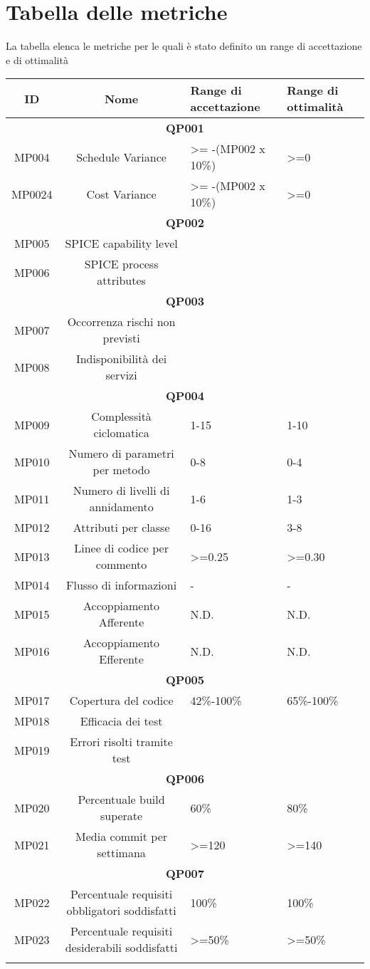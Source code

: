 \section{Tabella delle metriche}
\label{Tab2.2}
La tabella elenca le metriche per le quali è stato definito un range di accettazione e di ottimalità
\begin{tabularx}{\textwidth}{|c|c|X|X|}
	\hline 
	\textbf{ID} & \textbf{Nome} & \textbf{Range di accettazione}  & \textbf{Range di ottimalità}  \\ 
	\hline
	\multicolumn{4}{|c|}{\textbf{QP001}} \\
	\hline 
	MP004 & Schedule Variance & >= -(MP002 x 10\%) & >=0 \\ 
	\hline
	MP0024 &Cost Variance& >= -(MP002 x 10\%) & >=0 \\ 
	\hline
	\multicolumn{4}{|c|}{\textbf{QP002}} \\
	\hline
	MP005 & SPICE capability level &  &  \\ 
	\hline 
	MP006 & SPICE process attributes &  &  \\ 
	\hline
	\multicolumn{4}{|c|}{\textbf{QP003}} \\
	\hline
	MP007 & Occorrenza rischi non previsti &  &  \\ 
	\hline 
	MP008 & Indisponibilità dei servizi &  &  \\ 
	\hline
	\multicolumn{4}{|c|}{\textbf{QP004}} \\
	\hline
	MP009 & Complessità ciclomatica & 1-15 & 1-10 \\ 
	\hline 
	MP010 & Numero di parametri per metodo & 0-8 & 0-4 \\ 
	\hline 
	MP011 & Numero di livelli di annidamento & 1-6 & 1-3 \\ 
	\hline 
	MP012 & Attributi per classe & 0-16 & 3-8 \\ 
	\hline 
	MP013 & Linee di codice per commento & >=0.25 & >=0.30 \\ 
	\hline
	MP014 & Flusso di informazioni & - & - \\ 
	\hline 
	MP015 & Accoppiamento Afferente & N.D. & N.D. \\ 
	\hline 
	MP016 & Accoppiamento Efferente & N.D. & N.D. \\ 
	\hline
	\multicolumn{4}{|c|}{\textbf{QP005}} \\
	\hline
	MP017 & Copertura del codice & 42\%-100\% & 65\%-100\% \\ 
	\hline 
	MP018 & Efficacia dei test &  &  \\ 
	\hline 
	MP019 & Errori risolti tramite test &  &  \\ 
	\hline
	\multicolumn{4}{|c|}{\textbf{QP006}} \\
	\hline
	MP020 & Percentuale build superate& 60\% & 80\%\\
	\hline
	MP021 & Media commit per settimana & >=120 & >=140\\
	\hline
	\multicolumn{4}{|c|}{\textbf{QP007}} \\
	\hline
	MP022& Percentuale requisiti obbligatori soddisfatti& 100\% & 100\% \\
	\hline
	MP023& Percentuale requisiti desiderabili soddisfatti& >=50\% &>=50\%\\
	\hline
	\caption{Tabella delle metriche dei processi}
\end{tabularx}
